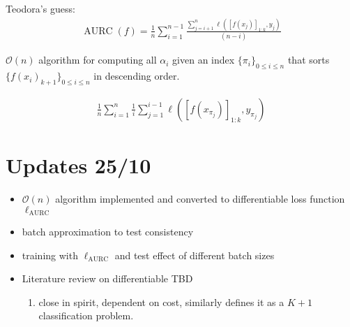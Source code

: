 
Teodora's guess:
\begin{align}
    \operatorname{AURC}(f) = \frac{1}{n} \sum_{i=1}^{n-1} \frac{\sum_{j=i+1}^n\ell([f(x_{j})]_{1:k},y_j)}{(n-i)}\label{eq:aurcloss_n2}
\end{align}


$\mathcal{O}(n)$ algorithm for computing all $\alpha_i$ given an index $\{\pi_i\}_{0\leq i\leq n}$ that sorts $\{f(x_i)_{k+1}\}_{0\leq i \leq n}$ in descending order.

\begin{align}
    \frac{1}{n} \sum_{i=1}^{n} \frac{1}{i} \sum_{j=1}^{i-1}\ell([f(x_{\pi_j})]_{1:k},y_{\pi_j})
    \label{eq:aurcloss_n}
\end{align}




\section*{Updates 25/10}

\begin{itemize}
    \item $\mathcal{O}(n)$ algorithm implemented and converted to differentiable loss function $\ell_{\mathrm{AURC}}$
    \item batch approximation to test consistency
    \item training with $\ell_{\mathrm{AURC}}$ and test effect of different batch sizes
    \item Literature review on differentiable \AURC{} TBD
    \begin{enumerate}
        \item \cite{cao2022generalizing} close in spirit, dependent on cost, similarly defines it as a $K+1$ classification problem. 
    \end{enumerate}
\end{itemize}




